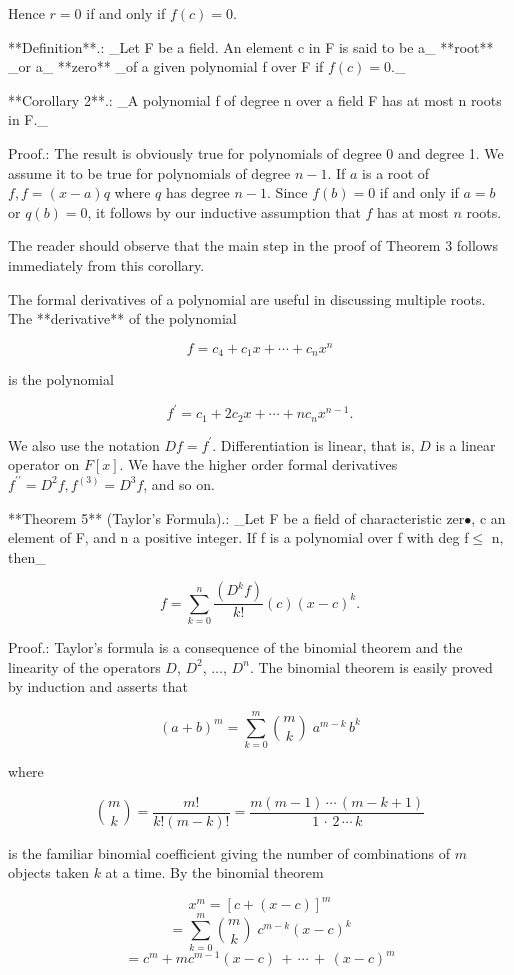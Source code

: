Hence \(r=0\) if and only if \(f(c)=0\).

**Definition**.: _Let F be a field. An element c in F is said to be a_ **root** _or a_ **zero** _of a given polynomial f over F if \(f(c)=0\)._

**Corollary 2**.: _A polynomial f of degree n over a field F has at most n roots in F._

Proof.: The result is obviously true for polynomials of degree 0 and degree 1. We assume it to be true for polynomials of degree \(n-1\). If \(a\) is a root of \(f,f=(x-a)q\) where \(q\) has degree \(n-1\). Since \(f(b)=0\) if and only if \(a=b\) or \(q(b)=0\), it follows by our inductive assumption that \(f\) has at most \(n\) roots.

The reader should observe that the main step in the proof of Theorem 3 follows immediately from this corollary.

The formal derivatives of a polynomial are useful in discussing multiple roots. The **derivative** of the polynomial

\[f=c_{4}+c_{1}x+\cdots+c_{n}x^{n}\]

is the polynomial

\[f^{\prime}=c_{1}+2c_{2}x+\cdots+nc_{n}x^{n-1}.\]

We also use the notation \(Df=f^{\prime}\). Differentiation is linear, that is, \(D\) is a linear operator on \(F[x]\). We have the higher order formal derivatives \(f^{\prime\prime}=D^{2}f,f^{(3)}=D^{3}f\), and so on.

**Theorem 5** (Taylor's Formula).: _Let F be a field of characteristic zer\(\bullet\), c an element of F, and n a positive integer. If f is a polynomial over f with deg f\(\leq\) n, then_

\[f=\sum\limits_{k=0}^{n}\frac{(D^{k}f)}{k!}(c)(x-c)^{k}.\]

Proof.: Taylor's formula is a consequence of the binomial theorem and the linearity of the operators \(D\), \(D^{2}\), \(\ldots\), \(D^{n}\). The binomial theorem is easily proved by induction and asserts that

\[(a+b)^{m}=\sum\limits_{k=0}^{m}\binom{m}{k}\;a^{m-k}\,b^{k}\]

where

\[\binom{m}{k}=\frac{m!}{k!(m-k)!}=\frac{m(m-1)\,\cdots\,(m-k+1)}{1\,\cdot\,2\, \cdots\,k}\]

is the familiar binomial coefficient giving the number of combinations of \(m\) objects taken \(k\) at a time. By the binomial theorem

\[x^{m} = [c+(x-c)]^{m}\] \[= \sum\limits_{k=0}^{m}\binom{m}{k}\;c^{m-k}(x-c)^{k}\] \[= c^{m}+mc^{m-1}(x-c)\,+\,\cdots\,+\,(x-c)^{m}\] 